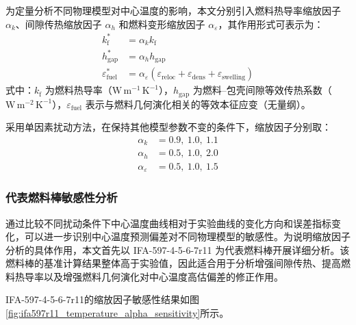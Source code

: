 为定量分析不同物理模型对中心温度的影响，本文分别引入燃料热导率缩放因子 \(\alpha_k\)、间隙传热缩放因子 \(\alpha_h\) 和燃料变形缩放因子 \(\alpha_\varepsilon\)，其作用形式可表示为：
\begin{align}
	k_{\mathrm f}^\ast &= \alpha_k k_{\mathrm f} \nonumber \\
	h_\mathrm{gap}^\ast &= \alpha_h h_\mathrm{gap} \nonumber \\
	\varepsilon^\ast_\mathrm{fuel}
	&=
	\alpha_\varepsilon
	\left(
	\varepsilon_\mathrm{reloc}
	+
	\varepsilon_\mathrm{dens}
	+
	\varepsilon_\mathrm{swelling}
	\right) \label{eq:fuel_params}
\end{align}
\noindent 式中：\(k_{\mathrm f}\) 为燃料热导率（$\mathrm{W\,m^{-1}\,K^{-1}}$），\(h_\mathrm{gap}\) 为燃料--包壳间隙等效传热系数（$\mathrm{W\,m^{-2}\,K^{-1}}$），\(\varepsilon_\mathrm{fuel}\) 表示与燃料几何演化相关的等效本征应变（无量纲）。

采用单因素扰动方法，在保持其他模型参数不变的条件下，缩放因子分别取：
\begin{align}
	\alpha_k &= 0.9,\ 1.0,\ 1.1 \nonumber \\
	\alpha_h &= 0.5,\ 1.0,\ 2.0 \nonumber \\
	\alpha_\varepsilon &= 0.5,\ 1.0,\ 1.5 \label{eq:alpha_params}
\end{align}

\subsubsection{代表燃料棒敏感性分析}

通过比较不同扰动条件下中心温度曲线相对于实验曲线的变化方向和误差指标变化，可以进一步识别中心温度预测偏差对不同物理模型的敏感性。为说明缩放因子分析的具体作用，本文首先以 IFA-597-4-5-6-7r11 为代表燃料棒开展详细分析。该燃料棒的基准计算结果整体高于实验值，因此适合用于分析增强间隙传热、提高燃料热导率以及增强燃料几何演化对中心温度高估偏差的修正作用。

IFA-597-4-5-6-7r11的缩放因子敏感性结果如图\ref{fig:ifa597r11_temperature_alpha_sensitivity}所示。

